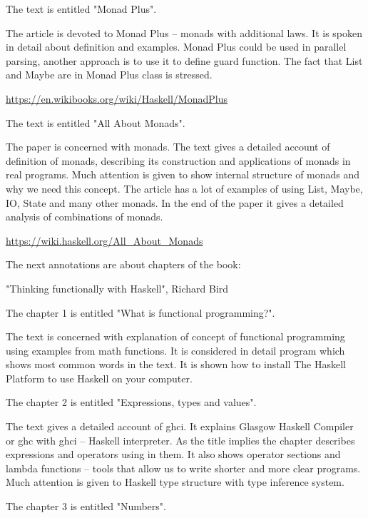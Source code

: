 \documentclass[a4paper, 14pt]{extarticle}
\begin{document}
The text is entitled "Monad Plus".

The article is devoted to Monad Plus -- monads with additional laws.
It is spoken in detail about definition and examples.
Monad Plus could be used in parallel parsing, another approach is to use it to define guard function.
The fact that List and Maybe are in Monad Plus class is stressed.

\medskip
\url{https://en.wikibooks.org/wiki/Haskell/MonadPlus}

\vskip 1cm

The text is entitled "All About Monads".

The paper is concerned with monads.
The text gives a detailed account of definition of monads, describing its construction and
applications of monads in real programs.
Much attention is given to show internal structure of monads and why we need this concept.
The article has a lot of examples of using List, Maybe, IO, State and many other monads.
In the end of the paper it gives a detailed analysis of combinations of monads.

\medskip
\url{https://wiki.haskell.org/All_About_Monads}

\vskip 1cm

The next annotations are about chapters of the book:

"Thinking functionally with Haskell", Richard Bird

\bigskip

The chapter 1 is entitled "What is functional programming?".

The text is concerned with explanation of concept of functional programming using examples 
from math functions. It is considered in detail program which shows most common words in
the text. It is shown how to install The Haskell Platform to use Haskell on your computer.

\vskip 1cm

The chapter 2 is entitled "Expressions, types and values".

The text gives a detailed account of ghci. It explains Glasgow Haskell Compiler or ghc with
ghci -- Haskell interpreter. As the title implies the chapter describes expressions and
operators using in them. It also shows operator sections and lambda functions -- tools that
allow us to write shorter and more clear programs. Much attention is given to Haskell type
structure with type inference system.

\vskip 1cm

The chapter 3 is entitled "Numbers".
\end{document}

